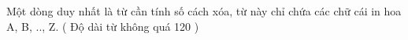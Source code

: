 Một dòng duy nhất là từ cần tính số cách xóa, từ này chỉ chứa các chữ cái in hoa A, B, .., Z. ( Độ dài từ không quá 120 )